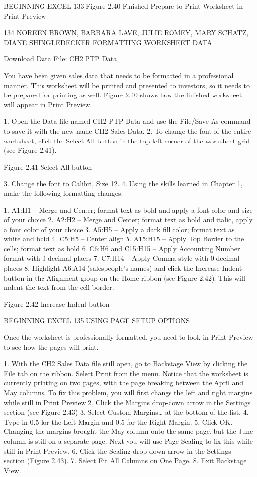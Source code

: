 BEGINNING EXCEL 133
Figure 2.40 Finished Prepare to Print Worksheet in Print Preview


134 NOREEN BROWN, BARBARA LAVE, JULIE ROMEY, MARY SCHATZ, DIANE SHINGLEDECKER
FORMATTING WORKSHEET DATA

Download Data File: CH2 PTP Data

You have been given sales data that needs to be formatted in a professional manner. This worksheet
will be printed and presented to investors, so it needs to be prepared for printing as well. Figure 2.40
shows how the finished worksheet will appear in Print Preview.

1. Open the Data file named CH2 PTP Data and use the File/Save As command to save it with the
new name CH2 Sales Data.
2. To change the font of the entire worksheet, click the Select All button in the top left corner of
the worksheet grid (see Figure 2.41).




Figure 2.41 Select All button


3. Change the font to Calibri, Size 12.
4. Using the skills learned in Chapter 1, make the following formatting changes:

1. A1:H1 – Merge and Center; format text as bold and apply a font color and size of your
choice
2. A2:H2 – Merge and Center; format text as bold and italic, apply a font color of your choice
3. A5:H5 – Apply a dark fill color; format text as white and bold
4. C5:H5 – Center align
5. A15:H15 – Apply Top Border to the cells; format text as bold
6. C6:H6 and C15:H15 – Apply Accounting Number format with 0 decimal places
7. C7:H14 – Apply Comma style with 0 decimal places
8. Highlight A6:A14 (salespeople’s names) and click the Increase Indent button in the
Alignment group on the Home ribbon (see Figure 2.42). This will indent the text from the
cell border.




Figure 2.42 Increase Indent button




BEGINNING EXCEL 135
USING PAGE SETUP OPTIONS

Once the worksheet is professionally formatted, you need to look in Print Preview to see how the
pages will print.

1. With the CH2 Sales Data file still open, go to Backstage View by clicking the File tab on the
ribbon. Select Print from the menu. Notice that the worksheet is currently printing on two
pages, with the page breaking between the April and May columns. To fix this problem, you will
first change the left and right margins while still in Print Preview
2. Click the Margins drop-down arrow in the Settings section (see Figure 2.43)
3. Select Custom Margins… at the bottom of the list.
4. Type in 0.5 for the Left Margin and 0.5 for the Right Margin.
5. Click OK. Changing the margins brought the May column onto the same page, but the June
column is still on a separate page. Next you will use Page Scaling to fix this while still in Print
Preview.
6. Click the Scaling drop-down arrow in the Settings section (Figure 2.43).
7. Select Fit All Columns on One Page.
8. Exit Backstage View.




